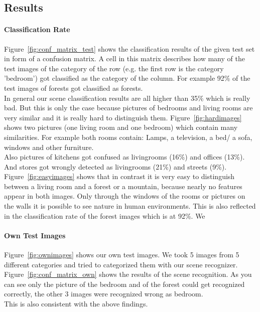 \documentclass[subfigure,epsfig,fleqn,float,numbers=noenddot]{scrartcl}
\begin{document}
\subsection{Results}
\label{sec:results}

\paragraph{Classification Rate}
\label{sec:classification}
Figure~\ref{fig:conf_matrix_test} shows the classification results of the given test set in form of a confusion matrix. A cell in this matrix describes how many of the test images of the category of the row (e.g. the first row is the category 'bedroom') got classified as the category of the column. For example 92\% of the test images of forests got classified as forests.\\
In general our scene classification results are all higher than 35\% which is really bad. But this is only the case because pictures of bedrooms and living rooms are very similar and it is really hard to distinguish them. Figure~\ref{fig:hardimages} shows two pictures (one living room and one bedroom) which contain many similarities. For example both rooms contain: Lamps, a television, a bed/ a sofa, windows and other furniture.\\
Also pictures of kitchens got confused as livingrooms (16\%) and offices (13\%). And stores got wrongly detected as livingrooms (21\%) and streets (9\%).
Figure~\ref{fig:easyimages} shows that in contrast it is very easy to distinguish between a living room and a forest or a mountain, because nearly no features appear in both images. Only through the windows of the rooms or pictures on the walls it is possible to see nature in human environments. This is also reflected in the classification rate of the forest images which is at 92\%.
We

\paragraph{Own Test Images}
\label{sec:owntestimages}
Figure~\ref{fig:ownimages} shows our own test images. We took 5 images from 5 different categories and tried to categorized them with our scene recognizer. Figure~\ref{fig:conf_matrix_own} shows the results of the scene recognition. As you can see only the picture of the bedroom and of the forest could get recognized correctly, the other 3 images were recognized wrong as bedroom.\\ This is also consistent with the above findings.
\end{document}
